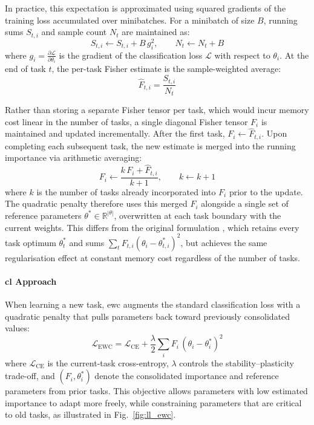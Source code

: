 In practice, this expectation is approximated using squared gradients of the training loss accumulated over minibatches. For a minibatch of size $B$, running sums $S_{t,i}$ and sample count $N_t$ are maintained as:
%
\begin{equation}\label{eqn:ewc_fisher_minibatch}
    S_{t,i} \leftarrow S_{t,i} + B\, g_i^2,
    \qquad
    N_t \leftarrow N_t + B
\end{equation}
%
where $g_i = \frac{\partial \mathcal{L}}{\partial \theta_i}$ is the gradient of the classification loss $\mathcal{L}$ with respect to $\theta_i$. At the end of task $t$, the per-task Fisher estimate is the sample-weighted average:
%
\begin{equation}\label{eqn:ewc_fisher_taskend}
    \hat{F}_{t,i} = \frac{S_{t,i}}{N_t}
\end{equation}

Rather than storing a separate Fisher tensor per task, which would incur memory cost linear in the number of tasks, a single diagonal Fisher tensor $F_i$ is maintained and updated incrementally. After the first task, $F_i \leftarrow \hat{F}_{t,i}$. Upon completing each subsequent task, the new estimate is merged into the running importance via arithmetic averaging:
%
\begin{equation}\label{eqn:ewc_fisher_merge}
    F_i \leftarrow \frac{k\, F_i + \hat{F}_{t,i}}{k+1},
    \qquad k \leftarrow k+1
\end{equation}
%
where $k$ is the number of tasks already incorporated into $F_i$ prior to the update. The quadratic penalty therefore uses this merged $F_i$ alongside a single set of reference parameters $\theta^* \in \mathbb{R}^{|\theta|}$, overwritten at each task boundary with the current weights. This differs from the original formulation \cite{ll_ewc_2017}, which retains every task optimum $\theta^*_t$ and sums $\sum_t F_{t,i}(\theta_i - \theta_{t,i}^*)^2$, but achieves the same regularisation effect at constant memory cost regardless of the number of tasks.

\paragraph{\gls{cl} Approach}

When learning a new task, \gls{ewc} augments the standard classification loss with a quadratic penalty that pulls parameters back toward previously consolidated values:
%
\begin{equation}\label{eqn:ewc_loss}
    \mathcal{L}_\text{EWC}
    =
    \mathcal{L}_\text{CE}
    +
    \frac{\lambda}{2}
    \sum_i F_i\,(\theta_i-\theta_i^*)^2
\end{equation}
%
where $\mathcal{L}_\text{CE}$ is the current-task cross-entropy, $\lambda$ controls the stability--plasticity trade-off, and $(F_i,\theta_i^*)$ denote the consolidated importance and reference parameters from prior tasks. This objective allows parameters with low estimated importance to adapt more freely, while constraining parameters that are critical to old tasks, as illustrated in Fig.~\ref{fig:ll_ewc}.

